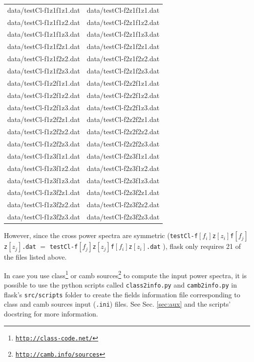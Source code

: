 \documentclass[12pt]{book} %
\newenvironment{alltt}{\ttfamily}{\par}
\begin{document}
\begin{alltt}
\begin{center}
\begin{tabular}{cc}
 data/testCl-f1z1f1z1.dat & data/testCl-f2z1f1z1.dat \\
 data/testCl-f1z1f1z2.dat & data/testCl-f2z1f1z2.dat \\ 
 data/testCl-f1z1f1z3.dat & data/testCl-f2z1f1z3.dat \\
 data/testCl-f1z1f2z1.dat & data/testCl-f2z1f2z1.dat \\
 data/testCl-f1z1f2z2.dat & data/testCl-f2z1f2z2.dat \\
 data/testCl-f1z1f2z3.dat & data/testCl-f2z1f2z3.dat \\
 data/testCl-f1z2f1z1.dat & data/testCl-f2z2f1z1.dat \\
 data/testCl-f1z2f1z2.dat & data/testCl-f2z2f1z2.dat \\
 data/testCl-f1z2f1z3.dat & data/testCl-f2z2f1z3.dat \\
 data/testCl-f1z2f2z1.dat & data/testCl-f2z2f2z1.dat \\
 data/testCl-f1z2f2z2.dat & data/testCl-f2z2f2z2.dat \\
 data/testCl-f1z2f2z3.dat & data/testCl-f2z2f2z3.dat \\
 data/testCl-f1z3f1z1.dat & data/testCl-f2z3f1z1.dat \\
 data/testCl-f1z3f1z2.dat & data/testCl-f2z3f1z2.dat \\
 data/testCl-f1z3f1z3.dat & data/testCl-f2z3f1z3.dat \\
 data/testCl-f1z3f2z1.dat & data/testCl-f2z3f2z1.dat \\
 data/testCl-f1z3f2z2.dat & data/testCl-f2z3f2z2.dat \\
 data/testCl-f1z3f2z3.dat & data/testCl-f2z3f2z3.dat \\
\end{tabular}
\end{center}
\end{alltt}
However, since the cross power spectra are symmetric 
({\tt testCl-f}$[f_i]${\tt z}$[z_i]${\tt f}$[f_j]${\tt z}$[z_j]${\tt .dat} $=$ 
 {\tt testCl-f}$[f_j]${\tt z}$[z_j]${\tt f}$[f_i]${\tt z}$[z_i]${\tt .dat} ), 
{\sc flask} only requires 21 of the files listed above.

In case you use {\sc class}\footnote{\tt{\href{http://class-code.net/}{http://class-code.net/}}} 
\citep{Blas11x, Dio13x} or 
{\sc camb sources}\footnote{\tt{\href{http://camb.info/sources}{http://camb.info/sources}}}
\citep{Challinor11x} to compute the input power spectra, it is possible to use the 
{\sc python} scripts called {\tt class2info.py} and {\tt camb2info.py} in {\sc flask}'s 
{\tt src/scripts} folder to create the fields information file corresponding to {\sc class} and 
{\sc camb sources} input ({\tt .ini}) files. See Sec. \ref{sec:aux} and the scripts' docstring for more information.
\end{document}
